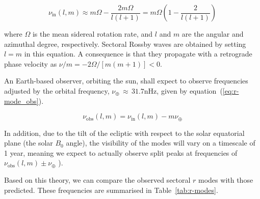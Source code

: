 \begin{equation}
\nu_{\mathrm{in}}(l,m) \approx m\Omega - \frac{2m\Omega}{l(l + 1)}  = m\Omega \left(1 - \frac{2}{l(l + 1)}\right)
\label{eq:r-mode}
\end{equation}

where $\Omega$ is the mean sidereal rotation rate, and $l$ and $m$ are the angular and azimuthal degree, respectively. Sectoral Rossby waves are obtained by setting $l=m$ in this equation. A consequence is that they propagate with a retrograde phase velocity as $\nu / m = -2 \Omega/[m(m + 1)] < 0$.

An Earth-based observer, orbiting the sun, shall expect to observe frequencies adjusted by the orbital frequency, $\nu_\oplus \, \approx \, 31.7$nHz, given by equation~(\ref{eq:r-mode_obs}).

\begin{equation}
\nu_{\mathrm{obs}}(l,m) = \nu_{\mathrm{in}}(l,m) - m\nu_{\oplus}
\label{eq:r-mode_obs}
\end{equation}

In addition, due to the tilt of the ecliptic with respect to the solar equatorial plane (the solar $B_0$ angle), the visibility of the modes will vary on a timescale of 1 year, meaning we expect to actually observe split peaks at frequencies of $\nu_{\mathrm{obs}}(l,m) \pm \nu_{\oplus}$ \citep{lanza_sectoral_2019}).

Based on this theory, we can compare the observed sectoral $r$ modes with those predicted. These frequencies are summarised in Table~\ref{tab:r-modes}.

